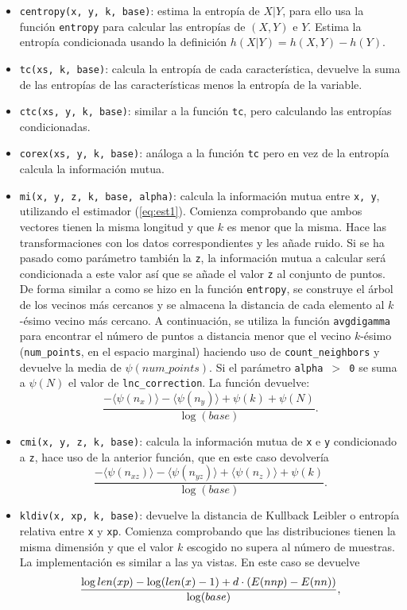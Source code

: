 \documentclass[12pt,a4paper]{report} %
\let\mathbb\relax
\theoremstyle{definition}
\begin{document}
\begin{itemize}
\item \texttt{centropy(x, y, k, base)}: estima la entropía de $X|Y$, para ello usa la función \texttt{entropy} para calcular las entropías de $(X,Y)$ e $Y$. Estima la entropía condicionada usando la definición $h(X|Y) = h(X,Y)-h(Y)$.
\item \texttt{tc(xs, k, base)}: calcula la entropía de cada característica, devuelve la suma de las entropías de las características menos la entropía de la variable.
\item \texttt{ctc(xs, y, k, base)}: similar a la función \texttt{tc}, pero calculando las entropías condicionadas.
\item \texttt{corex(xs, y, k, base)}: análoga a la función \texttt{tc} pero en vez de la entropía calcula la información mutua.
\item \texttt{mi(x, y, z, k, base, alpha)}: calcula la información mutua entre \texttt{x, y}, utilizando el estimador (\ref{eq:est1}). Comienza comprobando que ambos vectores tienen la misma longitud y que $k$ es menor que la misma. Hace las transformaciones con los datos correspondientes y les añade ruido. Si se ha pasado como parámetro también la  \texttt{z}, la información mutua a calcular será condicionada a este valor así que se añade el valor \texttt{z} al conjunto de puntos. De forma similar a como se hizo en la función \texttt{entropy}, se construye el árbol de los vecinos más cercanos y se almacena la distancia de cada elemento al $k$-ésimo vecino más cercano. A continuación, se utiliza la función \texttt{avgdigamma} para encontrar el número de puntos a distancia menor que el vecino $k$-ésimo (\texttt{num\_points}, en el espacio marginal) haciendo uso de \texttt{count\_neighbors} y devuelve la media de $\psi(num\_points)$. Si el parámetro \texttt{alpha $>$ 0} se suma a $\psi(N)$ el valor de \texttt{lnc\_correction}. La función devuelve:\[
\frac{- \langle \psi(n_x) \rangle - \langle \psi(n_y) \rangle + \psi(k) + \psi(N)}{\log (base)}.
\]
\item \texttt{cmi(x, y, z, k, base)}: calcula la información mutua de \texttt{x} e \texttt{y} condicionado a \texttt{z}, hace uso de la anterior función, que en este caso devolvería \[
  \frac{- \langle\psi(n_{xz})\rangle - \langle\psi(n_{yz})\rangle + \langle\psi(n_z)\rangle + \psi(k)}{\log(base)}.
\]
\item \texttt{kldiv(x, xp, k, base)}: devuelve la distancia de Kullback Leibler o entropía relativa entre \texttt{x} y \texttt{xp}. Comienza comprobando que las distribuciones tienen la misma dimensión y que el valor $k$ escogido no supera al número de muestras. La implementación es similar a las ya vistas. En este caso se devuelve\[
\frac{\log len(xp) - \log(len(x) -1) + d \cdot (\mathbb{E}( nnp) - \mathbb{E} (nn))}{\log(base)},
\]


\end{itemize}
\end{document}
